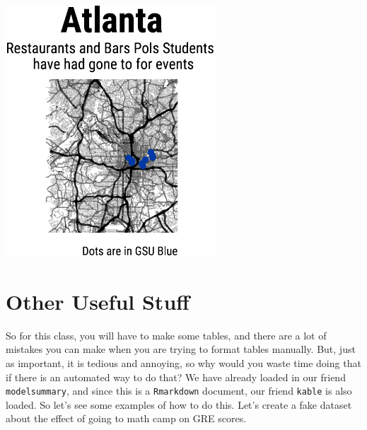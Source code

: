 \documentclass[]{tufte-handout}
\begin{document}
\begin{center}\includegraphics{R-Guide_files/figure-latex/map-1} \end{center}

\hypertarget{other-useful-stuff}{%
\section{Other Useful Stuff}\label{other-useful-stuff}}

So for this class, you will have to make some tables, and there are a
lot of mistakes you can make when you are trying to format tables
manually. But, just as important, it is tedious and annoying, so why
would you waste time doing that if there is an automated way to do that?
We have already loaded in our friend \texttt{modelsummary}, and since
this is a \texttt{Rmarkdown} document, our friend \texttt{kable} is also
loaded. So let's see some examples of how to do this. Let's create a
fake dataset about the effect of going to math camp on GRE scores.
\end{document}
